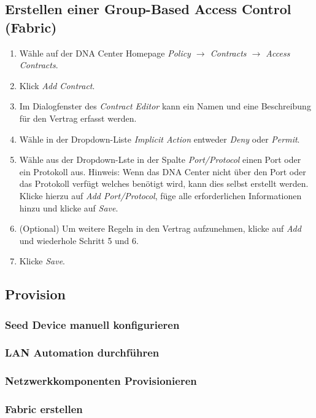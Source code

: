 \subsection{Erstellen einer Group-Based Access Control (Fabric)}
\begin{enumerate}
	\item Wähle auf der DNA Center Homepage \textit{Policy $\rightarrow$ Contracts $\rightarrow$ Access Contracts}.
	\item Klick \textit{Add Contract}.
	\item Im Dialogfenster des \textit{Contract Editor} kann ein Namen und eine Beschreibung für den Vertrag erfasst werden.
	\item Wähle in der Dropdown-Liste \textit{Implicit Action} entweder \textit{Deny} oder \textit{Permit}.
	\item Wähle aus der Dropdown-Lste in der Spalte \textit{Port/Protocol} einen Port oder ein Protokoll aus. Hinweis: Wenn das DNA Center nicht über den Port oder das Protokoll verfügt welches benötigt wird, kann dies selbst erstellt werden. Klicke hierzu auf \textit{Add Port/Protocol}, füge alle erforderlichen Informationen hinzu und klicke auf \textit{Save}.
	\item (Optional) Um weitere Regeln in den Vertrag aufzunehmen, klicke auf \textit{Add} und wiederhole Schritt 5 und 6.
	\item Klicke \textit{Save}.
\end{enumerate}

\subsection{Provision}
\subsubsection{Seed Device manuell konfigurieren}

\subsubsection{LAN Automation durchführen}

\subsubsection{Netzwerkkomponenten Provisionieren}

\subsubsection{Fabric erstellen}
